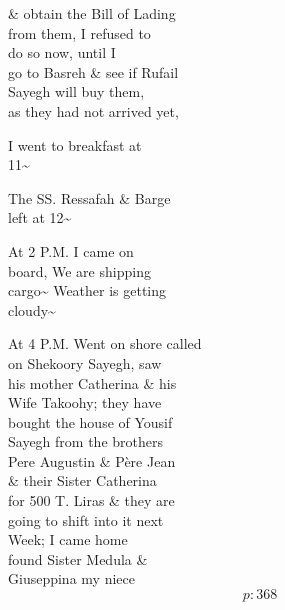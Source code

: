\documentclass{report}
\begin{document}


	\par{
 	\& obtain the Bill of Lading\ \\from them, I refused to\ \\do so now, until I\ \\go to Basreh \& see if Rufail\ \\Sayegh will buy them,\ \\as they had not arrived yet,\ \\
	}

	\par{
 	I went to breakfast at\ \\11\~{}\ \\
	}

	\par{
 	The SS. Ressafah \& Barge\ \\left at 12\~{}\ \\
	}

	\par{
 	At 2 P.M. I came on\ \\board, We are shipping\ \\cargo\~{} Weather is getting\ \\cloudy\~{}\ \\
	}

	\par{
 	At 4 P.M. Went on shore called\ \\on Shekoory Sayegh, saw\ \\his mother Catherina \& his\ \\Wife Takoohy; they have\ \\bought the house of Yousif\ \\Sayegh from the brothers\ \\Pere Augustin \& Père Jean\ \\\& their Sister Catherina\ \\for 500 T. Liras \& they are\ \\going to shift into it next\ \\Week; I came home\ \\found Sister Medula \&\ \\Giuseppina my niece\ \\
  \[p: 368 \]

	}

\end{document}
